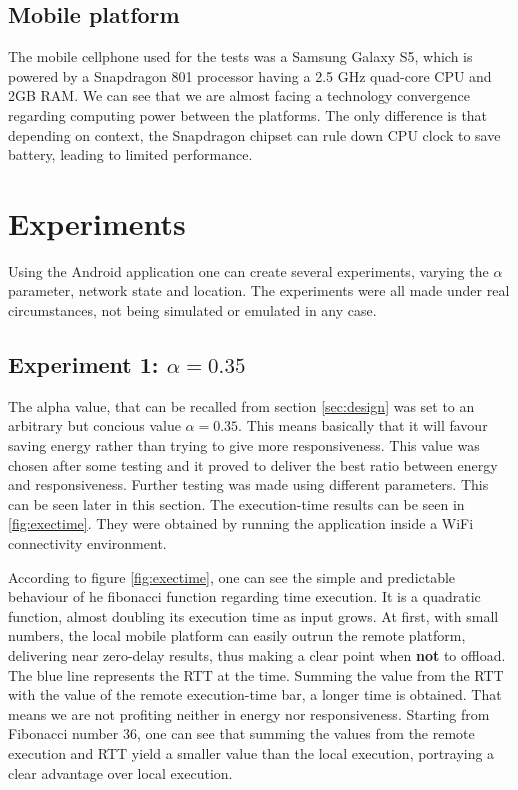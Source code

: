 \documentclass[10pt, conference, letterpaper]{IEEEtran}
\begin{document}
  \subsection{Mobile platform}
  The mobile cellphone used for the tests was a Samsung Galaxy S5, which is powered by a Snapdragon 801 processor having a 2.5 GHz quad-core CPU and 2GB RAM. We can see that we are almost facing a technology convergence regarding computing power between the platforms. The only difference is that depending on context, the Snapdragon chipset can rule down CPU clock to save battery, leading to limited performance.

  \section{Experiments}
  Using the Android application one can create several experiments, varying the $\alpha$ parameter, network state and location. The experiments were all made under real circumstances, not being simulated or emulated in any case.

  \subsection{Experiment 1: $\alpha = 0.35$}
  The alpha value, that can be recalled from section \ref{sec:design} was set to an arbitrary but concious value $\alpha = 0.35$. This means basically that it will favour saving energy rather than trying to give more responsiveness. This value was chosen after some testing and it proved to deliver the best ratio between energy and responsiveness. Further testing was made using different parameters. This can be seen later in this section. The execution-time results can be seen in \ref{fig:exectime}. They were obtained by running the application inside a WiFi connectivity environment.

  According to figure \ref{fig:exectime}, one can see the simple and predictable behaviour of he fibonacci function regarding time execution. It is a quadratic function, almost doubling its execution time as input grows. At first, with small numbers, the local mobile platform can easily outrun the remote platform, delivering near zero-delay results, thus making a clear point when \textbf{not} to offload. The blue line represents the RTT at the time. Summing the value from the RTT with the value of the remote execution-time bar, a longer time is obtained. That means we are not profiting neither in energy nor responsiveness. Starting from Fibonacci number 36, one can see that summing the values from the remote execution and RTT yield a smaller value than the local execution, portraying a clear advantage over local execution.
\end{document}

